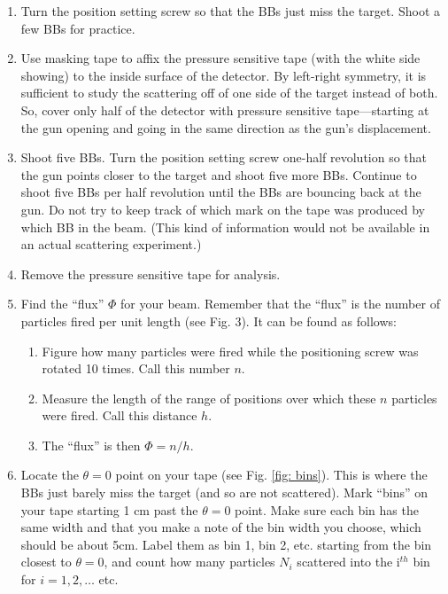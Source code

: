 \documentclass[11pt]{article}
\begin{document}
\begin{enumerate}

\item Turn the position setting screw so that the BBs just miss the target.
Shoot a few BBs for practice.

\item Use masking tape to affix the pressure sensitive tape (with the white side
showing) to the inside surface of the detector. By left-right symmetry, it is
sufficient to study the scattering off of one side of the target instead of
both. So, cover only half of the detector with pressure sensitive tape—starting
at the gun opening and going in the same direction as the gun's displacement.

\item Shoot five BBs. Turn the position setting screw one-half revolution so
that the gun points closer to the target and shoot five more BBs. Continue to
shoot five BBs per half revolution until the BBs are bouncing back at the gun.
Do not try to keep track of which mark on the tape was produced by which BB in
the beam. (This kind of information would not be available in an actual
scattering experiment.)

\item Remove the pressure sensitive tape for analysis.

\item Find the ``flux'' $\Phi$ for your beam. Remember that the ``flux'' is the number of particles
fired per unit length (see Fig. 3). It can be found as follows:

  \begin{enumerate}
  \item Figure how many particles were fired while the positioning screw was
    rotated 10 times. Call this number $n$.
  \item Measure the length of the range of positions over which these $n$ particles were fired.
    Call this distance $h$.
  \item The ``flux'' is then $\Phi = n/h$.
  \end{enumerate}
  
\item Locate the $\theta = 0$ point on your tape (see Fig. \ref{fig: bins}). This
is where the BBs just barely miss the target (and so are not scattered). Mark
``bins'' on your tape starting 1 cm past the $\theta = 0$ point. Make sure each bin
 has the same width and that you make a note of the bin width you choose, which should 
 be about 5cm. Label them as bin 1, bin 2, etc. starting from the bin
closest to $\theta=0$, and count how many particles $N_i$ scattered into the
i$^{th}$ bin for $i=1, 2, \ldots$ etc.
  


\end{enumerate}
\end{document}
